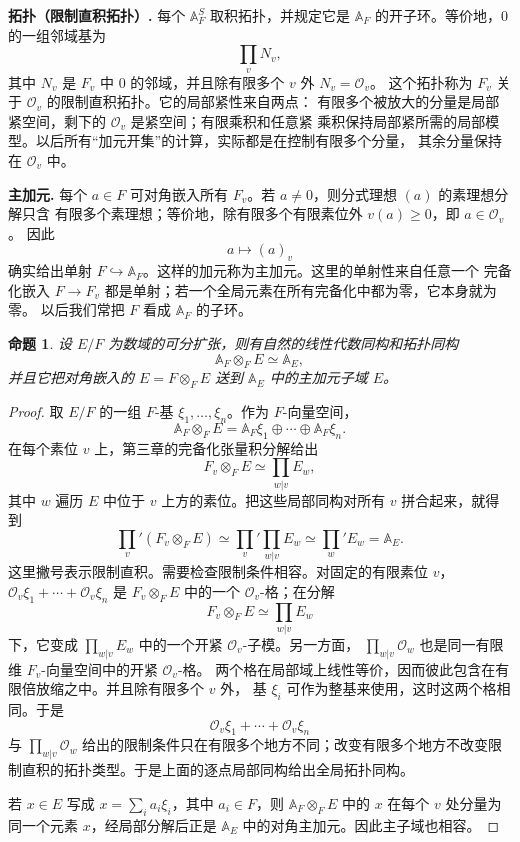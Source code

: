 \documentclass[11pt,a4paper,openany]{ctexbook}
\numberwithin{equation}{chapter}
\newcommand{\A}{\mathbb{A}}
\theoremstyle{plain}
\newtheorem{proposition}[theorem]{命题}
\theoremstyle{definition}
\theoremstyle{remark}
\begin{document}
\textbf{拓扑（限制直积拓扑）.}
每个 $\A_F^S$ 取积拓扑，并规定它是 $\A_F$ 的开子环。等价地，$0$ 的一组邻域基为
\[
 \prod_vN_v,
\]
其中 $N_v$ 是 $F_v$ 中 $0$ 的邻域，并且除有限多个 $v$ 外 $N_v=\mathcal O_v$。
这个拓扑称为 $F_v$ 关于 $\mathcal O_v$ 的限制直积拓扑。它的局部紧性来自两点：
有限多个被放大的分量是局部紧空间，剩下的 $\mathcal O_v$ 是紧空间；有限乘积和任意紧
乘积保持局部紧所需的局部模型。以后所有“加元开集”的计算，实际都是在控制有限多个分量，
其余分量保持在 $\mathcal O_v$ 中。

\textbf{主加元.}
每个 $a\in F$ 可对角嵌入所有 $F_v$。若 $a\ne0$，则分式理想 $(a)$ 的素理想分解只含
有限多个素理想；等价地，除有限多个有限素位外 $v(a)\ge0$，即 $a\in\mathcal O_v$。
因此
\[
 a\longmapsto (a)_v
\]
确实给出单射 $F\hookrightarrow\A_F$。这样的加元称为主加元。这里的单射性来自任意一个
完备化嵌入 $F\to F_v$ 都是单射；若一个全局元素在所有完备化中都为零，它本身就为零。
以后我们常把 $F$ 看成 $\A_F$ 的子环。

\begin{proposition}
设 $E/F$ 为数域的可分扩张，则有自然的线性代数同构和拓扑同构
\[
 \A_F\otimes_FE\simeq \A_E,
\]
并且它把对角嵌入的 $E=F\otimes_FE$ 送到 $\A_E$ 中的主加元子域 $E$。
\end{proposition}

\begin{proof}
取 $E/F$ 的一组 $F$-基 $\xi_1,\ldots,\xi_n$。作为 $F$-向量空间，
\[
 \A_F\otimes_FE=\A_F\xi_1\oplus\cdots\oplus\A_F\xi_n.
\]
在每个素位 $v$ 上，第三章的完备化张量积分解给出
\[
 F_v\otimes_FE\simeq\prod_{w|v}E_w,
\]
其中 $w$ 遍历 $E$ 中位于 $v$ 上方的素位。把这些局部同构对所有 $v$ 拼合起来，就得到
\[
 \prod_v'(F_v\otimes_FE)\simeq
 \prod_v'\prod_{w|v}E_w\simeq \prod_w'E_w=\A_E.
\]
这里撇号表示限制直积。需要检查限制条件相容。对固定的有限素位 $v$，
$\mathcal O_v\xi_1+\cdots+\mathcal O_v\xi_n$ 是 $F_v\otimes_FE$ 中的一个
$\mathcal O_v$-格；在分解
\[
F_v\otimes_FE\simeq\prod_{w|v}E_w
\]
下，它变成 $\prod_{w|v}E_w$ 中的一个开紧 $\mathcal O_v$-子模。另一方面，
$\prod_{w|v}\mathcal O_w$ 也是同一有限维 $F_v$-向量空间中的开紧 $\mathcal O_v$-格。
两个格在局部域上线性等价，因而彼此包含在有限倍放缩之中。并且除有限多个 $v$ 外，
基 $\xi_i$ 可作为整基来使用，这时这两个格相同。于是
\[
 \mathcal O_v\xi_1+\cdots+\mathcal O_v\xi_n
\]
与 $\prod_{w|v}\mathcal O_w$ 给出的限制条件只在有限多个地方不同；改变有限多个地方不改变限制直积的拓扑类型。于是上面的逐点局部同构给出全局拓扑同构。

若 $x\in E$ 写成 $x=\sum_i a_i\xi_i$，其中 $a_i\in F$，则 $\A_F\otimes_FE$ 中的 $x$ 在每个 $v$ 处分量为同一个元素 $x$，经局部分解后正是 $\A_E$ 中的对角主加元。因此主子域也相容。
\end{proof}
\end{document}
